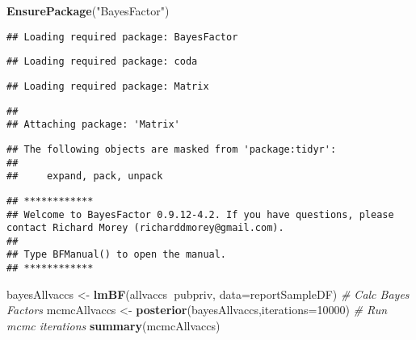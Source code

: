 \documentclass[]{article}
\newenvironment{Shaded}{\begin{snugshade}}{\end{snugshade}}
\newcommand{\CommentTok}[1]{\textcolor[rgb]{0.56,0.35,0.01}{\textit{#1}}}
\newcommand{\DataTypeTok}[1]{\textcolor[rgb]{0.13,0.29,0.53}{#1}}
\newcommand{\DecValTok}[1]{\textcolor[rgb]{0.00,0.00,0.81}{#1}}
\newcommand{\KeywordTok}[1]{\textcolor[rgb]{0.13,0.29,0.53}{\textbf{#1}}}
\newcommand{\NormalTok}[1]{#1}
\newcommand{\OperatorTok}[1]{\textcolor[rgb]{0.81,0.36,0.00}{\textbf{#1}}}
\newcommand{\StringTok}[1]{\textcolor[rgb]{0.31,0.60,0.02}{#1}}
\begin{document}
\begin{Shaded}
\begin{Highlighting}[]
\KeywordTok{EnsurePackage}\NormalTok{(}\StringTok{"BayesFactor"}\NormalTok{)}
\end{Highlighting}
\end{Shaded}

\begin{verbatim}
## Loading required package: BayesFactor
\end{verbatim}

\begin{verbatim}
## Loading required package: coda
\end{verbatim}

\begin{verbatim}
## Loading required package: Matrix
\end{verbatim}

\begin{verbatim}
## 
## Attaching package: 'Matrix'
\end{verbatim}

\begin{verbatim}
## The following objects are masked from 'package:tidyr':
## 
##     expand, pack, unpack
\end{verbatim}

\begin{verbatim}
## ************
## Welcome to BayesFactor 0.9.12-4.2. If you have questions, please contact Richard Morey (richarddmorey@gmail.com).
## 
## Type BFManual() to open the manual.
## ************
\end{verbatim}

\begin{Shaded}
\begin{Highlighting}[]
\NormalTok{bayesAllvaccs <-}\StringTok{ }\KeywordTok{lmBF}\NormalTok{(allvaccs}\OperatorTok{~}\NormalTok{pubpriv, }\DataTypeTok{data=}\NormalTok{reportSampleDF) }\CommentTok{# Calc Bayes Factors}
\NormalTok{mcmcAllvaccs <-}\StringTok{ }\KeywordTok{posterior}\NormalTok{(bayesAllvaccs,}\DataTypeTok{iterations=}\DecValTok{10000}\NormalTok{)  }\CommentTok{# Run mcmc iterations}
\KeywordTok{summary}\NormalTok{(mcmcAllvaccs)}
\end{Highlighting}
\end{Shaded}
\end{document}
